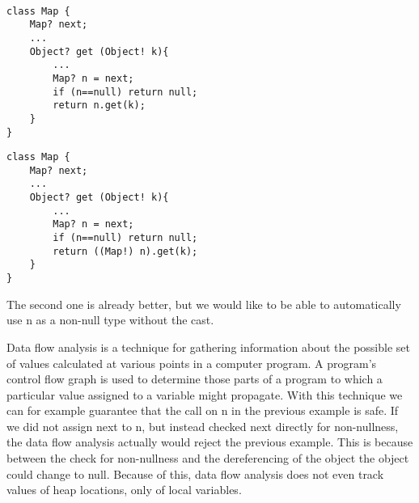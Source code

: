 \begin{mytitle}\hfill\\
\begin{minipage}{0.5\textwidth}
\begin{lstlisting}
class Map {
    Map? next;
    ...
    Object? get (Object! k){
        ...
        Map? n = next;
        if (n==null) return null;
        return n.get(k);
    }
}
\end{lstlisting}
\end{minipage}
\begin{minipage}{0.5\textwidth}
\begin{lstlisting}
class Map {
    Map? next;
    ...
    Object? get (Object! k){
        ...
        Map? n = next;
        if (n==null) return null;
        return ((Map!) n).get(k);
    }
}
\end{lstlisting}
\end{minipage}
The second one is already better, but we would like to be able to automatically use n as a non-null type without the cast.
\end{mytitle}
\begin{mytitle} Data flow analysis is a technique for gathering information about the possible set of values calculated at various points in a computer program. A program's control flow graph is used to determine those parts of a program to which a particular value assigned to a variable might propagate. With this technique we can for example guarantee that the call on n in the previous example is safe. If we did not assign next to n, but instead checked next directly for non-nullness, the data flow analysis actually would reject the previous example. This is because between the check for non-nullness and the dereferencing of the object the object could change to null. Because of this, data flow analysis does not even track values of heap locations, only of local variables.
\end{mytitle}

